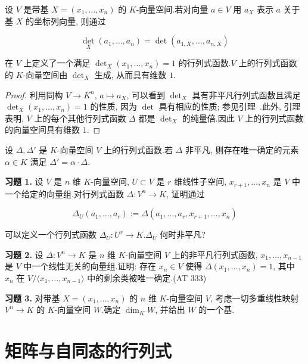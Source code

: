 \begin{theorem}\label{thm:4.2.8}
设 $V$ 是带基 $X = (x_1, \ldots, x_n)$ 的 $K$-向量空间.若对向量 $a \in V$ 用 $a_X$ 表示 $a$ 关于基 $X$ 的坐标列向量, 则通过

\[
\det_X(a_1, \ldots, a_n) = \det(a_{1, X}, \ldots, a_{n, X})
\]

在 $V$ 上定义了一个满足 $\det_X(x_1, \ldots, x_n) = 1$ 的行列式函数.$V$ 上的行列式函数的 $K$-向量空间由 $\det_X$ 生成, 从而具有维数 $1$.
\end{theorem}

\begin{proof}
利用同构 $V \to K^n$, $a \mapsto a_X$, 可以看到 $\det_X$ 具有非平凡行列式函数且满足 $\det_X(x_1, \ldots, x_n) = 1$ 的性质, 因为 $\det$ 具有相应的性质; 参见引理~.此外, 引理~ 表明, $V$ 上的每个其他行列式函数 $\varDelta$ 都是 $\det_X$ 的纯量倍.因此 $V$ 上的行列式函数的向量空间具有维数 $1$.
\end{proof}

\begin{corollary}\label{cor:4.2.9}
设 $\varDelta, \varDelta'$ 是 $K$-向量空间 $V$ 上的行列式函数.若 $\varDelta$ 非平凡, 则存在唯一确定的元素 $\alpha \in K$ 满足 $\varDelta' = \alpha \cdot \varDelta$.
\end{corollary}

\aufgaben

\noindent\textbf{习题 1.} 设 $V$ 是 $n$ 维 $K$-向量空间, $U \subset V$ 是 $r$ 维线性子空间, $x_{r + 1}, \ldots, x_n$ 是 $V$ 中一个给定的向量组.对行列式函数 $\varDelta \colon V^n \longrightarrow K$, 证明通过

\[
\varDelta_U(a_1, \ldots, a_r) := \varDelta(a_1, \ldots, a_r, x_{r + 1}, \ldots, x_n)
\]

可以定义一个行列式函数 $\varDelta_U \colon U^r \longrightarrow K$.$\varDelta_U$ 何时非平凡?

\medskip
\noindent\textbf{习题 2.} 设 $\varDelta \colon V^n \longrightarrow K$ 是 $n$ 维 $K$-向量空间 $V$ 上的非平凡行列式函数, $x_1, \ldots, x_{n-1}$ 是 $V$ 中一个线性无关的向量组.证明: 存在 $x_n \in V$ 使得 $\varDelta(x_1, \ldots, x_n) = 1$, 其中 $x_n$ 在 $V/\langle x_1, \ldots, x_{n-1}\rangle$ 中的剩余类被唯一确定.(AT 333)

\medskip
\noindent\textbf{习题 3.} 对带基 $X = (x_1, \ldots, x_n)$ 的 $n$ 维 $K$-向量空间 $V$, 考虑一切多重线性映射 $V^n \longrightarrow K$ 的 $K$-向量空间 $W$.确定 $\dim_K W$, 并给出 $W$ 的一个基.

\section{矩阵与自同态的行列式}\label{sec:4.3}

